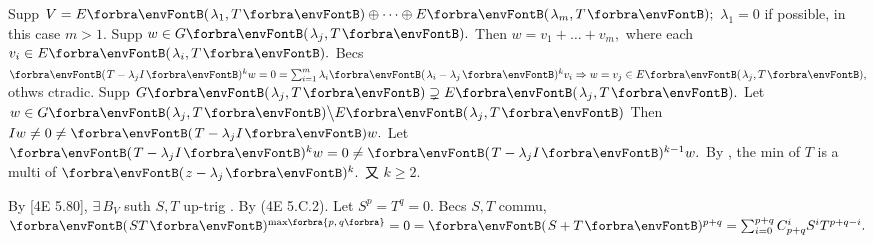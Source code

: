 Supp $V=E\Par{\lambda_1,T}\oplus\cdots\oplus E\Par{\lambda_m,T};$ $\lambda_1=0$ if possible, in this case $m>1.$\parSol{}
Supp $w\in G\Par{\lambda_j,T}.$ Then $w=v_1+\dots+v_m,$ where each $v_i\in E\Par{\lambda_i,T}.$\parSol{}
Becs $\Par{T-\lambda_jI}{^k}w=0=\sum_{i=1}^m\lambda_i\Par{\lambda_i-\lambda_j}{^k}v_i\Rightarrow w=v_j\in E\Par{\lambda_j,T},$ othws ctradic.\PfEnd\vspace{3pt}\parSol{}
\Or Supp $G\Par{\lambda_j,T}\supsetneq E\Par{\lambda_j,T}.$ Let $w\in G\Par{\lambda_j,T}\Backslash E\Par{\lambda_j,T}$\parSol{}
Then $Iw\neq0\neq\Par{T-\lambda_jI}w.$ Let $\Par{T-\lambda_jI}{^k}w=0\neq\Par{T-\lambda_jI}{^{k-1}}w.$\parSol{}
By , the min of $T$ is a multi of $\Par{z-\lambda_j}{^k}.$ 又 $k\geqslant 2.$\PfEnd
\SepLine

By [4E 5.80], $\exists\,B_V$ suth $S,T$ up-trig . By (4E 5.C.2).\PfEnd\vspace{2pt}\parSol{}
\Or Let $S^p=T^q=0.$ Becs $S,T$ commu, $\Par{ST}{^{\max\!\Bra[\scriptsize]{p,\,q}}}=0=\Par{S+T}{^{p+q}}=\sum_{i=0}^{p+q}\mathC_{p+q}^iS^iT^{p+q-i}.$\PfEndB
\SepLine



